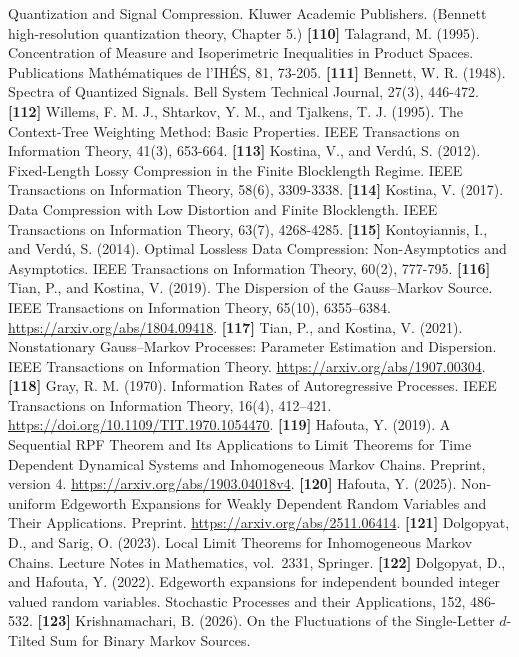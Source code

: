 \documentclass[
]{article}
\begin{document}
Quantization and Signal Compression. Kluwer Academic Publishers.
(Bennett high-resolution quantization theory, Chapter 5.)
\textbf{{[}110{]}} Talagrand, M. (1995). Concentration of Measure
and Isoperimetric Inequalities in Product Spaces. Publications
Math\'ematiques de l'IH\'ES, 81, 73-205.
\textbf{{[}111{]}} Bennett, W. R. (1948). Spectra of Quantized
Signals. Bell System Technical Journal, 27(3), 446-472.
\textbf{{[}112{]}} Willems, F. M. J., Shtarkov, Y. M., and Tjalkens,
T. J. (1995). The Context-Tree Weighting Method: Basic Properties.
IEEE Transactions on Information Theory, 41(3), 653-664.
\textbf{{[}113{]}} Kostina, V., and Verd\'u, S. (2012). Fixed-Length
Lossy Compression in the Finite Blocklength Regime. IEEE Transactions on
Information Theory, 58(6), 3309-3338.
\textbf{{[}114{]}} Kostina, V. (2017). Data Compression with Low
Distortion and Finite Blocklength. IEEE Transactions on Information
Theory, 63(7), 4268-4285.
\textbf{{[}115{]}} Kontoyiannis, I., and Verd\'u, S. (2014). Optimal
Lossless Data Compression: Non-Asymptotics and Asymptotics. IEEE
Transactions on Information Theory, 60(2), 777-795.
\textbf{{[}116{]}} Tian, P., and Kostina, V. (2019). The Dispersion of
the Gauss--Markov Source. IEEE Transactions on Information Theory,
65(10), 6355--6384. \url{https://arxiv.org/abs/1804.09418}.
\textbf{{[}117{]}} Tian, P., and Kostina, V. (2021). Nonstationary
Gauss--Markov Processes: Parameter Estimation and Dispersion.
IEEE Transactions on Information Theory. \url{https://arxiv.org/abs/1907.00304}.
\textbf{{[}118{]}} Gray, R. M. (1970). Information Rates of Autoregressive
Processes. IEEE Transactions on Information Theory, 16(4), 412--421.
\url{https://doi.org/10.1109/TIT.1970.1054470}.
\textbf{{[}119{]}} Hafouta, Y. (2019). A Sequential RPF
Theorem and Its Applications to Limit Theorems for Time Dependent
Dynamical Systems and Inhomogeneous Markov Chains. Preprint, version 4.
\url{https://arxiv.org/abs/1903.04018v4}.
\textbf{{[}120{]}} Hafouta, Y. (2025). Non-uniform
Edgeworth Expansions for Weakly Dependent Random Variables and Their
Applications. Preprint. \url{https://arxiv.org/abs/2511.06414}.
\textbf{{[}121{]}} Dolgopyat, D., and Sarig, O. (2023). Local Limit
Theorems for Inhomogeneous Markov Chains. Lecture Notes in Mathematics,
vol.\ 2331, Springer.
\textbf{{[}122{]}} Dolgopyat, D., and Hafouta, Y. (2022). Edgeworth
expansions for independent bounded integer valued random variables.
Stochastic Processes and their Applications, 152, 486-532.
\textbf{{[}123{]}} Krishnamachari, B. (2026). On the Fluctuations of the
Single-Letter $d$-Tilted Sum for Binary Markov Sources.
\end{document}
